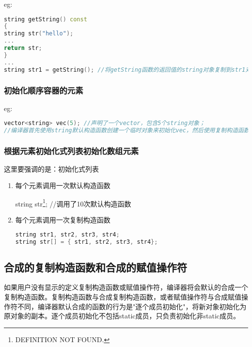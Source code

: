 \documentclass{article}
\begin{document}
eg:
\begin{lstlisting}[language=c++]
string getString() const
{
string str("hello");
...
return str;
}
...
string str1 = getString(); //将getString函数的返回值的string对象复制到str1对象
\end{lstlisting}
\subsubsection{初始化顺序容器的元素}
\label{sec-5-2-4}

eg:
\begin{lstlisting}[language=c++]
vector<string> vec(5); //声明了一个vector，包含5个string对象；
//编译器首先使用string默认构造函数创建一个临时对象来初始化vec，然后使用复制构造函数将临时值复制到vec的每个元素中。
\end{lstlisting}
\subsubsection{根据元素初始化式列表初始化数组元素}
\label{sec-5-2-5}

这里要强调的是：初始化式列表

\begin{enumerate}
\item 每个元素调用一次默认构造函数
\label{sec-5-2-5-1}

string str\footnote{DEFINITION NOT FOUND.}; //调用了10次默认构造函数
\item 每个元素调用一次复制构造函数
\label{sec-5-2-5-2}
\begin{lstlisting}[language=c++]
string str1, str2, str3, str4;
string str[] = { str1, str2, str3, str4};
\end{lstlisting}
\end{enumerate}
\subsection{合成的复制构造函数和合成的赋值操作符}
\label{sec-5-3}
如果用户没有显示的定义复制构造函数或赋值操作符，编译器将会默认的合成一个复制构造函数。复制构造函数与合成复制构造函数，或者赋值操作符与合成赋值操作符不同，编译器默认合成的函数的行为是"逐个成员初始化"，将新对象初始化为原对象的副本。逐个成员初始化不包括static成员，只负责初始化非static成员。
\end{document}
